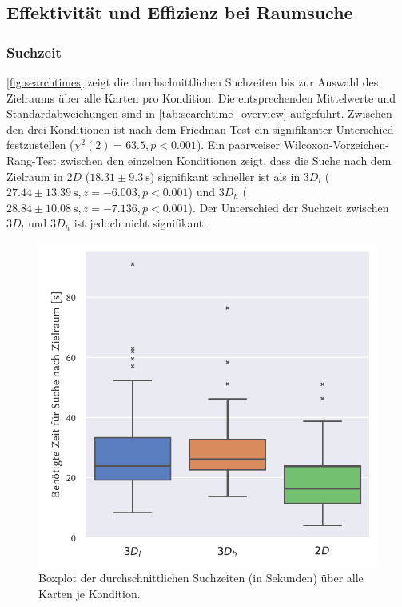 \subsection{Effektivität und Effizienz bei Raumsuche}
\subsubsection*{Suchzeit}
\label{ssec:searchtime}

\autoref{fig:searchtimes} zeigt die durchschnittlichen Suchzeiten bis zur Auswahl des Zielraums über alle Karten pro Kondition.
Die entsprechenden Mittelwerte und Standardabweichungen sind in \autoref{tab:searchtime_overview} aufgeführt.
Zwischen den drei Konditionen ist nach dem Friedman-Test ein signifikanter Unterschied festzustellen ($\chi^2(2) = \num{63.5}, p < 0.001$).
Ein paarweiser Wilcoxon-Vorzeichen-Rang-Test zwischen den einzelnen Konditionen zeigt, dass die Suche nach dem Zielraum in $2D$ ($\num{18.31} \pm \SI{9.3}{\second}$) signifikant schneller ist als in $3D_l$ ($\num{27.44} \pm \SI{13.39}{\second}, z=\num{-6.003}, p<\num{0.001}$) und $3D_h$ ($\num{28.84} \pm \SI{10.08}{\second}, z=\num{-7.136}, p<0.001$).
Der Unterschied der Suchzeit zwischen $3D_l$ und $3D_h$ ist jedoch nicht signifikant.
\begin{figure}[h!]
    \centering
    \includegraphics[width=0.7\linewidth]{figures/analysis/searchtime_boxplot}
    \caption{Boxplot der durchschnittlichen Suchzeiten (in Sekunden) über alle Karten je Kondition.}
    \label{fig:searchtimes}
\end{figure}

